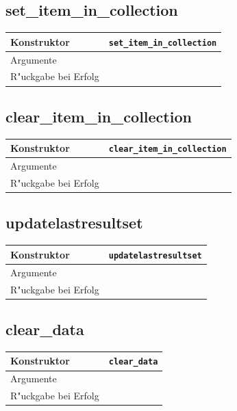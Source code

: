 \documentclass[11pt, twoside, a4paper, BCOR8mm, DIV12, bibtotoc,idxtotoc]{scrbook}
\begin{document}
\subsection{set\_item\_in\_collection}
\begin{shadowenv}
\begin{tabular}{lp{10cm}}
  Konstruktor & \texttt{set\_item\_in\_collection}\\
  \hline
  Argumente     & \\
  R"uckgabe bei Erfolg & \\
\end{tabular}
\end{shadowenv}

\subsection{clear\_item\_in\_collection}
\begin{shadowenv}
\begin{tabular}{lp{10cm}}
  Konstruktor & \texttt{clear\_item\_in\_collection}\\
  \hline
  Argumente     & \\
  R"uckgabe bei Erfolg & \\
\end{tabular}
\end{shadowenv}

\subsection{updatelastresultset}
\begin{shadowenv}
\begin{tabular}{lp{10cm}}
  Konstruktor & \texttt{updatelastresultset}\\
  \hline
  Argumente     & \\
  R"uckgabe bei Erfolg & \\
\end{tabular}
\end{shadowenv}

\subsection{clear\_data}
\begin{shadowenv}
\begin{tabular}{lp{10cm}}
  Konstruktor & \texttt{clear\_data}\\
  \hline
  Argumente     & \\
  R"uckgabe bei Erfolg & \\
\end{tabular}
\end{shadowenv}
\end{document}
